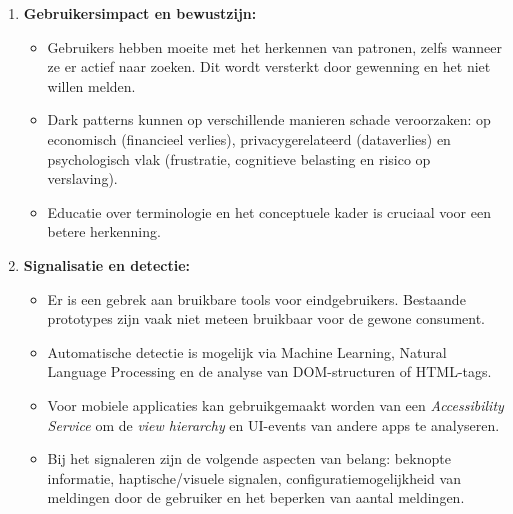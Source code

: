 \begin{enumerate}
    \pagebreak
    
    \item \textbf{Gebruikersimpact en bewustzijn:}
    \begin{itemize}
        \item Gebruikers hebben moeite met het herkennen van patronen, zelfs wanneer ze er actief naar zoeken. Dit wordt versterkt door gewenning en het niet willen melden.
        \item Dark patterns kunnen op verschillende manieren schade veroorzaken: op economisch (financieel verlies), privacygerelateerd (dataverlies) en psychologisch vlak (frustratie, cognitieve belasting en risico op verslaving).
        \item Educatie over terminologie en het conceptuele kader is cruciaal voor een betere herkenning.
    \end{itemize}
    
    \vspace{1em}
    
    \item \textbf{Signalisatie en detectie:}
    \begin{itemize}
        \item Er is een gebrek aan bruikbare tools voor eindgebruikers. Bestaande prototypes zijn vaak niet meteen bruikbaar voor de gewone consument.
        \item Automatische detectie is mogelijk via Machine Learning, Natural Language Processing en de analyse van DOM-structuren of HTML-tags.
        \item Voor mobiele applicaties kan gebruikgemaakt worden van een \textit{Accessibility Service} om de \textit{view hierarchy} en UI-events van andere apps te analyseren.
        \item Bij het signaleren zijn de volgende aspecten van belang: beknopte informatie, haptische/visuele signalen, configuratiemogelijkheid van meldingen door de gebruiker en het beperken van aantal meldingen.
    \end{itemize}
    
    \vspace{1em}
    

\end{enumerate}
